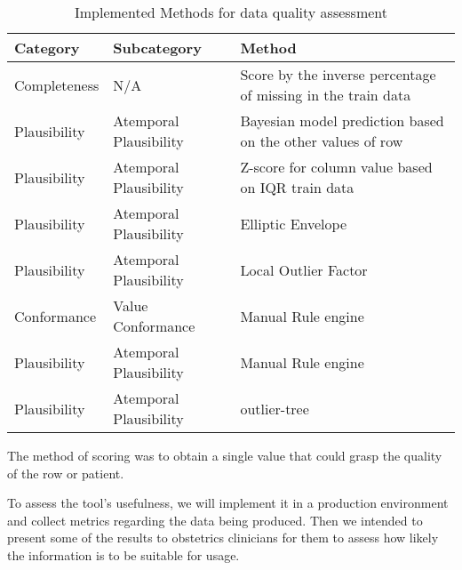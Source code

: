 \begin{table}[htpb]
\caption{Implemented Methods for data quality assessment} 
\renewcommand{\arraystretch}{1.4}
\setlength{\tabcolsep}{10pt}

\begin{tabularx}{\textwidth}{ p{2cm} p{3.5cm} X }
\hline
 Category   & Subcategory           & Method   \\ \hline
Completeness     & N/A               & Score by the inverse percentage of missing in the train data         \\ 
Plausibility & Atemporal Plausibility & Bayesian model prediction based on the other values of row \\ 
Plausibility & Atemporal Plausibility         & Z-score for column value based on IQR train data       \\    
Plausibility & Atemporal Plausibility           & Elliptic Envelope                       \\ 
Plausibility & Atemporal Plausibility           & Local Outlier Factor                \\ 
Conformance & Value Conformance           & Manual Rule engine                           \\ 
Plausibility & Atemporal Plausibility           & Manual Rule engine                      \\ 
Plausibility & Atemporal Plausibility           & outlier-tree                      \\ 
\hline
\end{tabularx}
\label{tab:methods}
\end{table}
The method of scoring was to obtain a single value that could grasp the quality of the row or patient.

To assess the tool's usefulness, we will implement it in a production environment and collect metrics regarding the data being produced. Then we intended to present some of the results to obstetrics clinicians for them to assess how likely the information is to be suitable for usage.

